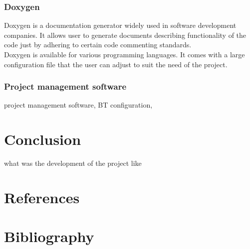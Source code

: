 \documentclass[12pt,a4paper]{article}
\begin{document}
		\subsubsection{Doxygen}
		Doxygen is a documentation generator widely used in software development companies. It
		allows user to generate documents describing functionality of the code just by adhering 
		to certain code commenting standards.\\
		
		Doxygen is available for various programming languages. It comes with a large configuration 
		file that the user can adjust to suit the need of the project.
		
		\subsubsection{Project management software}
		project management software, BT configuration,
		\newpage
	
	\section{Conclusion}
	what was the development of the project like
	\newpage
	
	\section{References}
	\newpage
	
	\section{Bibliography}
	\newpage
	
	\listoffigures
	
\end{document}
